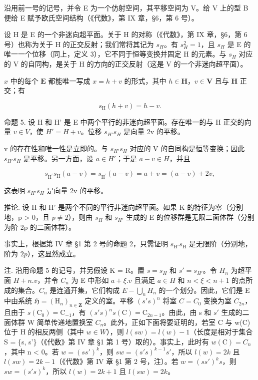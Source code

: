 沿用前一号的记号，并令 E 为一个仿射空间，其平移空间为 V。给 V 上的型 B 便给 E 赋予欧氏空间结构（《代数》，第 IX 章，§6，第 6 号）。

设 H 是 E 的一个非迷向超平面。关于 H 的对称（《代数》，第 IX 章，§6，第 6 号）也称为关于 H 的正交反射；我们常将其记为 \(s_{H}\)。有 \(s_{H}^{2}=1\)，且 \(s_{H}\) 是 E 的唯一一个位移（同上，定义 3），它不同于恒等变换并固定 H 的元素。与 \(s_{H}\) 对应的 V 的自同构，是关于 H 的方向的正交反射（这是 V 的一个非迷向超平面）。

\(x\) 中的每个 \(\mathbf{E}\) 都能唯一写成 \(x = h + v\) 的形式，其中 \(h \in \mathbf{H}\)，\(v \in \mathbf{V}\) 且与 \(\mathbf{H}\) 正交；有

\[
s _ {\mathrm{H}} (h + v) = h - v.
\]

命题 5. 设 H 和 H' 是 E 中两个平行的非迷向超平面。存在唯一的与 H 正交的向量 \(v \in V\)，使 \(H' = H + v\)。位移 \(s_{H'} s_{H}\) 是向量 2v 的平移。

v 的存在性和唯一性是立即的。与 \(s_{H'}s_{H}\) 对应的 V 的自同构是恒等变换；因此 \(s_{H'}s_{H}\) 是平移。另一方面，设 \(a \in H'\)；于是 \(a - v \in H\)，并且

\[
s _ {\mathrm {H^ {\prime}}} s _ {\mathrm{H}} (a - v) = s _ {\mathrm {H^ {\prime}}} (a - v) = a + v = (a - v) + 2 v,
\]

这表明 \(s_{H'}s_{H}\) 是向量 2v 的平移。

推论. 设 H 和 H' 是两个不同的平行非迷向超平面。如果 K 的特征为零（分别地，p \textgreater{} 0，且 \(p \neq 2\)），则由 \(s_{H}\) 和 \(s_{H'}\) 生成的 E 的位移群是无限二面体群（分别为阶 2p 的二面体群）。

事实上，根据第 IV 章 §1 第 2 号的命题 2，只需证明 \(s_{\mathrm{H}'}s_{\mathrm{H}}\) 是无限阶（分别地，阶为 \(2p\)），这显然成立。

注. 沿用命题 5 的记号，并另假设 K = R。置 \(s = s_{H}\) 和 \(s' = s_{H'}\)。令 \(H_{n}\) 为超平面 \(H + n.v\)，并令 \(C_{n}\) 为 E 中形如 \(a + \xi.v\) 且满足 \(a \in H\) 和 \(n < \xi < n + 1\) 的点所成的集合。\(C_{n}\) 是连通开集，它们构成 \(E - \bigcup_{n} H_{n}\) 的一个划分。因此，它们是 E 中由系统 \(\mathfrak{H} = (\mathrm{H}_{n})_{n \in \mathbf{Z}}\) 定义的室。平移 \((s's)^{n}\) 将室 \(C = C_{0}\) 变换为室 \(C_{2n}\)，且由于 \(s(\mathrm{C}_{0}) = \mathrm{C}_{-1}\)，有 \((s's)^{n}s(\mathrm{C}) = \mathrm{C}_{2n-1}\)。由此，由 s 和 \(s'\) 生成的二面体群 W 简单传递地置换室 \(C_{n}\)。此外，正如下面将要证明的，若室 C 与 w(C) 位于 H 的相反两侧（其中 \(w \in W\)），则 \(l(sw) = l(w) - 1\)（长度是相对于集合 S = \{s, s'\}（《代数》第 IV 章 §1 第 1 号）取的）。事实上，此时有 \(w(\mathrm{C}) = C_{n}\)，其中 n \textless{} 0。若 \(w = (ss')^{k}\)，则 \(sw = (s's)^{k-1}s'\)，所以 \(l(w) = 2k\) 且 \(l(sw) = 2k - 1\)（《代数》第 IV 章 §1 第 2 号，注）。若 \(w = (ss')^{k}s\)，则 \(sw = (s's)^{k}\)，所以 \(l(w) = 2k + 1\) 且 \(l(sw) = 2k\)。

